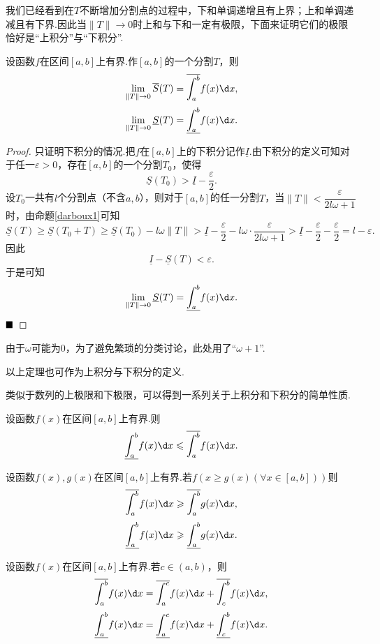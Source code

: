 我们已经看到在$T$不断增加分割点的过程中，下和单调递增且有上界；上和单调递减且有下界.因此当$\|T\|\to 0$时上和与下和一定有极限，下面来证明它们的极限恰好是“上积分”与“下积分”.
\begin{theorem}[Darboux定理]
	设函数$f$在区间$\left[a,b\right]$上有界.作$\left[a,b\right]$的一个分割$T$，则
	$$\lim\limits_{\|T\|\to 0}\overline{S}(T)=\overline{\int_{a}^{b}}f(x)\d x,$$
	$$\lim\limits_{\|T\|\to 0}\underline{S}(T)=\underline{\int_{a}^{b}}f(x)\d x.$$
\end{theorem}
\begin{proof}
	只证明下积分的情况.把$f$在$\left[a,b\right]$上的下积分记作$\underline{I}$.由下积分的定义可知对于任一$\varepsilon>0$，存在$\left[a,b\right]$的一个分割$T_0$，使得
	$$\underline{S}(T_0)>\underline{I}-\frac{\varepsilon}{2}.$$
	设$T_0$一共有$l$个分割点（不含$a,b$），则对于$\left[a,b\right]$的任一分割$T$，当$\|T\|<\dfrac{\varepsilon}{2l\omega+1}$时，由命题\ref{darboux1}可知
	$$\underline{S}(T)\geqslant\underline{S}(T_0+T)\geqslant\underline{S}(T_0)-l\omega\|T\|>\underline{I}-\frac{\varepsilon}{2}-l\omega\cdot\frac{\varepsilon}{2l\omega+1}>\underline{I}-\frac{\varepsilon}{2}-\frac{\varepsilon}{2}=l-\varepsilon.$$
	因此
	$$\underline{I}-\underline{S}(T)<\varepsilon.$$
	于是可知
	$$\lim\limits_{\|T\|\to 0}\underline{S}(T)=\underline{\int_{a}^{b}}f(x)\d x.$$
	$\hfill\blacksquare$
\end{proof}
\begin{remark}
	由于$\omega$可能为$0$，为了避免繁琐的分类讨论，此处用了“$\omega+1$”.
\end{remark}
\begin{remark}
	以上定理也可作为上积分与下积分的定义.
\end{remark}
类似于数列的上极限和下极限，可以得到一系列关于上积分和下积分的简单性质.
\begin{proposition}
	设函数$f(x)$在区间$\left[a,b\right]$上有界.则
	$$\underline{\int_{a}^{b}}f(x)\d x\leqslant\overline{\int_{a}^{b}}f(x)\d x.$$
\end{proposition}
\begin{proposition}[保序性]
	设函数$f(x),g(x)$在区间$\left[a,b\right]$上有界.若$f(x\geqslant g(x)(\forall x\in\left[a,b\right]))$则
	$$\overline{\int_{a}^{b}}f(x)\d x\geqslant\overline{\int_{a}^{b}}g(x)\d x,$$
	$$\underline{\int_{a}^{b}}f(x)\d x\geqslant\underline{\int_{a}^{b}}g(x)\d x.$$
\end{proposition}
\begin{proposition}[可加性]
	设函数$f(x)$在区间$\left[a,b\right]$上有界.若$c\in(a,b)$，则
	$$\overline{\int_{a}^{b}}f(x)\d x=\overline{\int_{a}^{c}}f(x)\d x+\overline{\int_{c}^{b}}f(x)\d x,$$
	$$\underline{\int_{a}^{b}}f(x)\d x=\underline{\int_{a}^{c}}f(x)\d x+\underline{\int_{c}^{b}}f(x)\d x.$$
\end{proposition}
